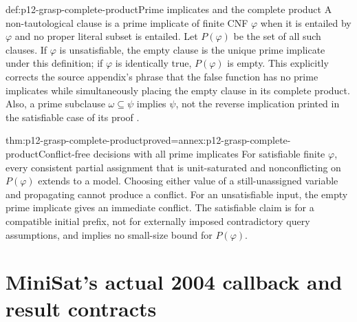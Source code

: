 \begin{hbdefinition}{def:p12-grasp-complete-product}{Prime implicates and the complete product}
A non-tautological clause is a prime implicate of finite CNF \(\varphi\)
when it is entailed by \(\varphi\) and no proper literal subset is entailed.
Let \(P(\varphi)\) be the set of all such clauses.  If \(\varphi\) is
unsatisfiable, the empty clause is the unique prime implicate under this
definition; if \(\varphi\) is identically true, \(P(\varphi)\) is empty.
This explicitly corrects the source appendix's phrase that the false function
has no prime implicates while simultaneously placing the empty clause in its
complete product.  Also, a prime subclause \(\omega\subseteq\psi\)
implies \(\psi\), not the reverse implication printed in the satisfiable
case of its proof
\cite[Appendix, Thm.~3, pp.~519--520]{MarquesSilvaSakallah1999}.
\end{hbdefinition}

\begin{hbtheorem}{thm:p12-grasp-complete-product}{proved=annex:p12-grasp-complete-product}{Conflict-free decisions with all prime implicates}
For satisfiable finite \(\varphi\), every consistent partial assignment
that is unit-saturated and nonconflicting on \(P(\varphi)\) extends to a
model.  Choosing either value of a still-unassigned variable and propagating
cannot produce a conflict.  For an unsatisfiable input, the empty prime
implicate gives an immediate conflict.  The satisfiable claim is for a
compatible initial prefix, not for externally imposed contradictory query
assumptions, and implies no small-size bound for \(P(\varphi)\).
\end{hbtheorem}

\section{MiniSat's actual 2004 callback and result contracts}

